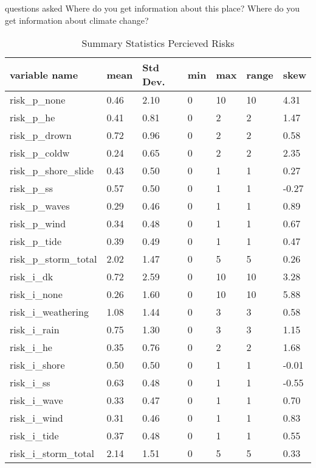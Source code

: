 questions asked Where do you get information about this place? Where do you get information about climate change?
\begin{center}
\begin{table}[!ht]
    \centering
    \begin{tabular}{|l|l|l|l|l|l|l|}
    \hline
        variable name & mean & Std Dev. & min & max & range & skew \\ \hline
        risk\_p\_none & 0.46 & 2.10 & 0 & 10 & 10 & 4.31\\ \hline
        risk\_p\_he & 0.41 & 0.81 & 0 & 2 & 2 & 1.47 \\ \hline
        risk\_p\_drown & 0.72 & 0.96 & 0 & 2 & 2 & 0.58  \\ \hline
        risk\_p\_coldw & 0.24 & 0.65 & 0 & 2 & 2 & 2.35  \\ \hline
        risk\_p\_shore\_slide & 0.43 & 0.50 & 0 & 1 & 1 & 0.27 \\ \hline
        risk\_p\_ss & 0.57 & 0.50 & 0 & 1 & 1 & -0.27  \\ \hline
        risk\_p\_waves & 0.29 & 0.46 & 0 & 1 & 1 & 0.89 \\ \hline
        risk\_p\_wind & 0.34 & 0.48 & 0 & 1 & 1 & 0.67  \\ \hline
        risk\_p\_tide & 0.39 & 0.49 & 0 & 1 & 1 & 0.47  \\ \hline
        risk\_p\_storm\_total & 2.02 & 1.47 & 0 & 5 & 5 & 0.26  \\ \hline
        risk\_i\_dk & 0.72 & 2.59 & 0 & 10 & 10 & 3.28  \\ \hline
        risk\_i\_none & 0.26 & 1.60 & 0 & 10 & 10 & 5.88 \\ \hline
        risk\_i\_weathering & 1.08 & 1.44 & 0 & 3 & 3 & 0.58  \\ \hline
        risk\_i\_rain & 0.75 & 1.30 & 0 & 3 & 3 & 1.15\\ \hline
        risk\_i\_he & 0.35 & 0.76 & 0 & 2 & 2 & 1.68 \\ \hline
        risk\_i\_shore & 0.50 & 0.50 & 0 & 1 & 1 & -0.01 \\ \hline
        risk\_i\_ss & 0.63 & 0.48 & 0 & 1 & 1 & -0.55  \\ \hline
        risk\_i\_wave & 0.33 & 0.47 & 0 & 1 & 1 & 0.70  \\ \hline
        risk\_i\_wind & 0.31 & 0.46 & 0 & 1 & 1 & 0.83 \\ \hline
        risk\_i\_tide & 0.37 & 0.48 & 0 & 1 & 1 & 0.55  \\ \hline
        risk\_i\_storm\_total & 2.14 & 1.51 & 0 & 5 & 5 & 0.33 \\ \hline
          \end{tabular}
    \caption{Summary Statistics Percieved Risks}
\label{table:summary_stats_percieved_risks}
\end{table}
\end{center}

